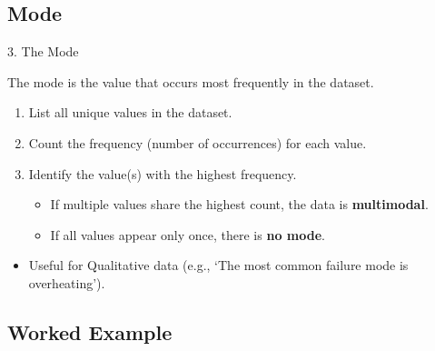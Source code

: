 \subsection{Mode}
\begin{frame}{3. The Mode}
    \begin{definition}[Mode]
        The \alert{mode} is the value that occurs most frequently in the dataset.
    \end{definition}
    
    \pause

    \begin{recipe}
        \begin{enumerate}
            \item List all unique values in the dataset.
            \item Count the frequency (number of occurrences) for each value.
            \item Identify the value(s) with the highest frequency.
            \begin{itemize}
                \item If multiple values share the highest count, the data is \textbf{multimodal}.
                \item If all values appear only once, there is \textbf{no mode}.
            \end{itemize}
        \end{enumerate}
    \end{recipe}

    \begin{itemize}
        \item Useful for Qualitative data (e.g., \lq The most common failure mode is overheating\rq).
    \end{itemize}
\end{frame}

\subsection{Worked Example}

